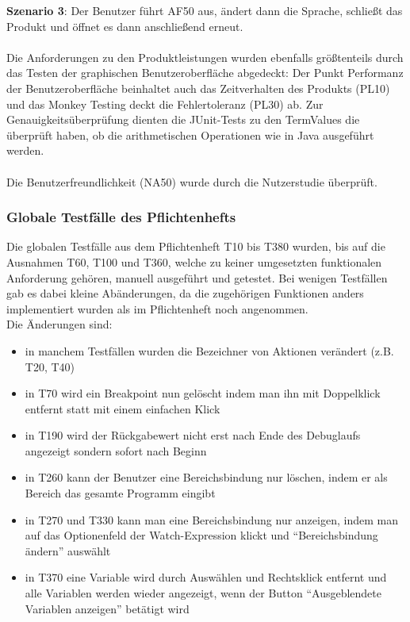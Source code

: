 \documentclass[parskip=full]{scrartcl}
\begin{document}
\textbf{Szenario 3}: Der Benutzer führt AF50 aus, ändert dann die Sprache, schließt das Produkt und öffnet es dann anschließend erneut. \\
 \\
Die Anforderungen zu den Produktleistungen wurden ebenfalls größtenteils durch das Testen der graphischen Benutzeroberfläche abgedeckt: Der Punkt Performanz der Benutzeroberfläche beinhaltet auch das Zeitverhalten des Produkts (PL10) und das Monkey Testing deckt die Fehlertoleranz (PL30) ab. Zur Genauigkeitsüberprüfung dienten die JUnit-Tests zu den TermValues die überprüft haben, ob die arithmetischen Operationen wie in Java ausgeführt werden. \\
 \\
Die Benutzerfreundlichkeit (NA50) wurde durch die Nutzerstudie überprüft. 

\subsubsection{Globale Testfälle des Pflichtenhefts} %
Die globalen Testfälle aus dem Pflichtenheft T10 bis T380 wurden, bis auf die Ausnahmen T60, T100 und T360, welche zu keiner umgesetzten funktionalen Anforderung gehören, manuell ausgeführt und getestet. Bei wenigen Testfällen gab es dabei kleine Abänderungen, da die zugehörigen Funktionen anders implementiert wurden als im Pflichtenheft noch angenommen. \\
Die Änderungen sind: \\
\begin{itemize}
	\item in manchem Testfällen wurden die Bezeichner von Aktionen verändert (z.B. T20, T40)
	\item in T70 wird ein Breakpoint nun gelöscht indem man ihn mit Doppelklick entfernt statt mit einem einfachen Klick
	\item  in T190 wird der Rückgabewert nicht erst nach Ende des Debuglaufs angezeigt sondern sofort nach Beginn
	\item in T260 kann der Benutzer eine Bereichsbindung nur löschen, indem er als Bereich das gesamte Programm eingibt
	\item in T270 und T330 kann man eine Bereichsbindung nur anzeigen, indem man auf das Optionenfeld der Watch-Expression klickt und \enquote{Bereichsbindung ändern} auswählt
	\item in T370 eine Variable wird durch Auswählen und Rechtsklick entfernt und alle Variablen werden wieder angezeigt, wenn der Button \enquote{Ausgeblendete Variablen anzeigen} betätigt wird
\end{itemize}
\end{document}
